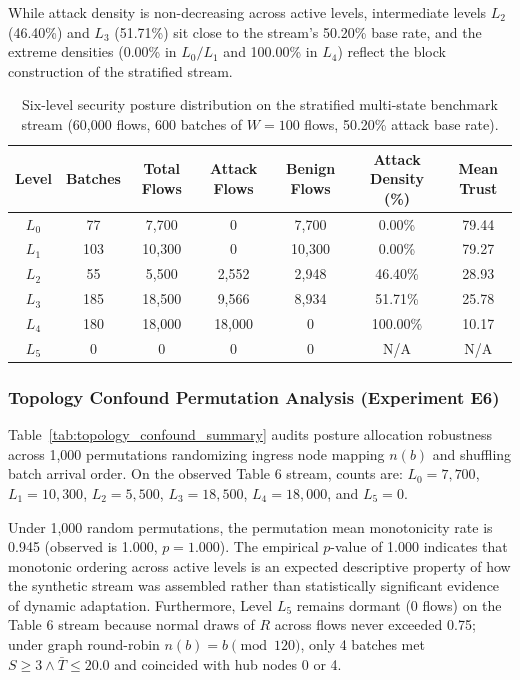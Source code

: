 \documentclass[journal,10pt,onecolumn]{IEEEtran}
\begin{document}
While attack density is non-decreasing across active levels, intermediate levels $L_2$ (46.40\%) and $L_3$ (51.71\%) sit close to the stream's 50.20\% base rate, and the extreme densities (0.00\% in $L_0/L_1$ and 100.00\% in $L_4$) reflect the block construction of the stratified stream.

\begin{table}[t]
\caption{Six-level security posture distribution on the stratified multi-state benchmark stream (60,000 flows, 600 batches of $W=100$ flows, 50.20\% attack base rate).}
\label{tab:posture_balanced}
\centering
\small
\begin{tabular}{ccccccc}
\toprule
\textbf{Level} & \textbf{Batches} & \textbf{Total Flows} & \textbf{Attack Flows} & \textbf{Benign Flows} & \textbf{Attack Density (\%)} & \textbf{Mean Trust} \\
\midrule
$L_0$ & 77 & 7,700 & 0 & 7,700 & 0.00\% & 79.44 \\
$L_1$ & 103 & 10,300 & 0 & 10,300 & 0.00\% & 79.27 \\
$L_2$ & 55 & 5,500 & 2,552 & 2,948 & 46.40\% & 28.93 \\
$L_3$ & 185 & 18,500 & 9,566 & 8,934 & 51.71\% & 25.78 \\
$L_4$ & 180 & 18,000 & 18,000 & 0 & 100.00\% & 10.17 \\
$L_5$ & 0 & 0 & 0 & 0 & N/A & N/A \\
\bottomrule
\end{tabular}
\end{table}

\subsubsection{Topology Confound Permutation Analysis (Experiment E6)}
Table~\ref{tab:topology_confound_summary} audits posture allocation robustness across 1,000 permutations randomizing ingress node mapping $n(b)$ and shuffling batch arrival order. On the observed Table 6 stream, counts are: $L_0 = 7,700$, $L_1 = 10,300$, $L_2 = 5,500$, $L_3 = 18,500$, $L_4 = 18,000$, and $L_5 = 0$.

Under 1,000 random permutations, the permutation mean monotonicity rate is 0.945 (observed is 1.000, $p = 1.000$). The empirical $p$-value of 1.000 indicates that monotonic ordering across active levels is an expected descriptive property of how the synthetic stream was assembled rather than statistically significant evidence of dynamic adaptation. Furthermore, Level $L_5$ remains dormant (0 flows) on the Table 6 stream because normal draws of $R$ across flows never exceeded 0.75; under graph round-robin $n(b) = b \pmod{120}$, only 4 batches met $S \ge 3 \land \bar{T} \le 20.0$ and coincided with hub nodes 0 or 4.
\end{document}
